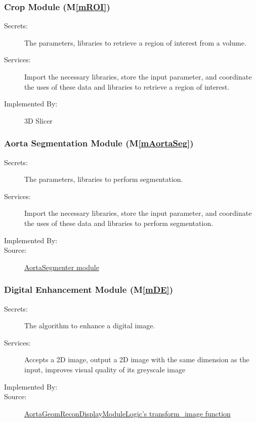 \documentclass[12pt, titlepage]{article}
\newcommand{\mref}[1]{M\ref{#1}}
\begin{document}
\subsubsection{Crop Module (\mref{mROI})}
\begin{description}
\item[Secrets:] The parameters, libraries to retrieve a region of interest from a volume.
\item[Services:] Import the necessary libraries, store the input parameter, and coordinate the uses of these data and libraries to retrieve a region of interest.
\item[Implemented By:] 3D Slicer
\end{description}

\subsubsection{Aorta Segmentation Module (\mref{mAortaSeg})}
\begin{description}
\item[Secrets:] The parameters, libraries to perform segmentation.
\item[Services:] Import the necessary libraries, store the input parameter, and coordinate the uses of these data and libraries to perform segmentation.
\item[Implemented By:] \progname
\item[Source:] \href{https://joviel25.github.io/AortaGR-design-document/AortaGeomReconDisplayModuleLib.html#module-AortaSegmenter}{AortaSegmenter module}
\end{description}

\subsubsection{Digital Enhancement Module (\mref{mDE})}
\begin{description}
\item[Secrets:] The algorithm to enhance a digital image. 
\item[Services:] Accepts a 2D image, output a 2D image with the same dimension as the input, improves visual quality of its greyscale image
\item[Implemented By:] \progname
\item[Source:] \href{https://joviel25.github.io/AortaGR-design-document/AortaGeomReconDisplayModule.html#AortaGeomReconDisplayModule.AortaGeomReconDisplayModuleLogic.transform_image}{AortaGeomReconDisplayModuleLogic's transform\_image function}
\end{description}
\end{document}
